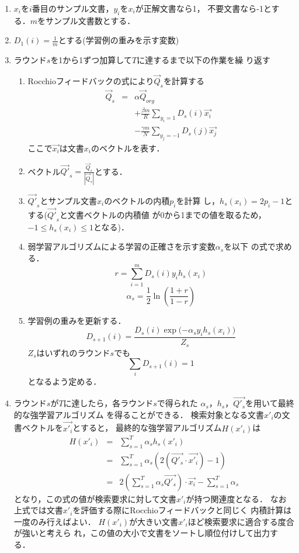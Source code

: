 \begin{enumerate}
\item $x_{i}$を$i$番目のサンプル文書，$y_{i}$を$x_{i}$が正解文書なら1，
不要文書なら-1とする．$m$をサンプル文書数とする．
\item $D_{1}(i)=\frac{1}{m}$とする(学習例の重みを示す変数)
\item ラウンド$s$を1から1ずつ加算して$T$に達するまで以下の作業を繰
り返す
\begin{enumerate}
\item Rocchioフィードバックの式により$\vec{Q}_{s}$を計算する
\begin{eqnarray*}
\vec{Q}_{s} & = & \alpha\vec{Q}_{org}\\
& & + \frac{\beta m}{R}\sum_{y_{i}=1}{D_{s}(i)\vec{x_{i}}}\\
& & - \frac{\gamma m}{N}\sum_{y_{j}=-1}{D_{s}(j)\vec{x_{j}}}
\end{eqnarray*}
ここで$\vec{x_{i}}$は文書$x_{i}$のベクトルを表す．
\item ベクトル$\vec{Q'}_{s}=\frac{\vec{Q}_{s}}{|\vec{Q}_{s}|}$とする．
\item $\vec{Q'}_{s}$とサンプル文書$x_{i}$のベクトルの内積$p_{i}$を計算
し，$h_{s}(x_{i})=2p_{i}-1$とする($\vec{Q'}_{s}$と文書ベクトルの内積値
が0から1までの値を取るため，$-1 \leq h_{s}(x_{i}) \leq 1 $となる)．
\item 弱学習アルゴリズムによる学習の正確さを示す変数$\alpha_{s}$を以下
の式で求める．
\[
r = \sum_{i=1}^{m}D_{s}(i)y_{i}h_{s}(x_{i})
\]
\[
\alpha_{s} = \frac{1}{2}\ln(\frac{1+r}{1-r})
\]
\item 学習例の重みを更新する．
\[
D_{s+1}(i) = \frac{D_{s}(i)\exp{(- \alpha_{s}y_{i}h_{s}(x_{i})})}{Z_{s}}
\]
$Z_{s}$はいずれのラウンド$s$でも
\[
\sum_{i}D_{s+1}(i)=1
\]
となるよう定める．
\end{enumerate}
\item ラウンド$s$が$T$に達したら，各ラウンド$s$で得られた
$\alpha_{s}$，$h_{s}$，$\vec{Q'_{s}}$を用いて最終的な強学習アルゴリズム
を得ることができる．
検索対象となる文書$x'_{i}$の文書ベクトルを$\vec{x'_{i}}$とすると，
最終的な強学習アルゴリズム$H(x'_{i})$は
\begin{eqnarray*}
H(x'_{i}) & = & \sum_{s=1}^{T}{\alpha_{s} h_{s}(x'_{i})}\\
& = & \sum_{s=1}^{T}{\alpha_{s}(2(\vec{Q'_{s}} \cdot \vec{x'_{i}})
- 1)}\\
& = & 2(\sum_{s=1}^{T}{\alpha_{s}\vec{Q'_{s}}}) \cdot
\vec{x_{i}}-\sum_{s=1}^{T} \alpha_{s}
\end{eqnarray*}
となり，この式の値が検索要求に対して文書$x'_{i}$が持つ関連度となる．
なお上式では文書$x'_{i}$を評価する際にRocchioフィードバックと同じく
内積計算は一度のみ行えばよい．
$H(x'_{i})$が大きい文書$x'_{i}$ほど検索要求に適合する度合が強いと考えら
れ，この値の大小で文書をソートし順位付けして出力する．
\end{enumerate}


